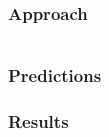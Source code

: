 \documentclass{beamer}
\begin{document}
\begin{frame}
  \frametitle{Approach}
  \begin{columns}
    \begin{column}{0.5\textwidth}
      
    \end{column}
    \begin{column}{0.5\textwidth}
      
    \end{column}
  \end{columns}
\end{frame}

\begin{frame}
  \frametitle{Predictions}
\end{frame}

\begin{frame}
  \frametitle{Results}
\end{frame}
\end{document}
